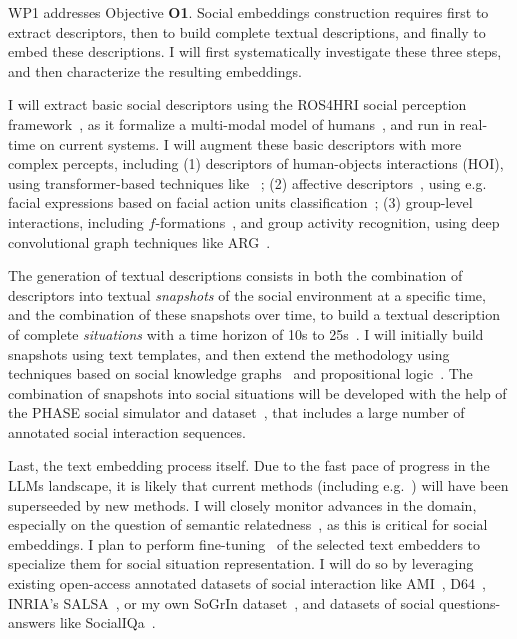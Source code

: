 WP1 addresses Objective \textbf{O1}. Social embeddings construction requires
first to extract descriptors, then to build complete textual descriptions, and
finally to embed these descriptions. I will first systematically investigate
these three steps, and then characterize the resulting embeddings.

I will extract basic social descriptors using the ROS4HRI social perception
framework~\cite{mohamed2021ros4hri}, as it formalize a multi-modal model of
humans~\cite{lemaignan2022ros}, and run in real-time on current systems. I will
augment these basic descriptors with more complex percepts, including (1)
descriptors of human-objects interactions (HOI), using transformer-based
techniques like~\cite{iftekhar2022what} ; (2) affective
descriptors~\cite{vinciarelli2009social}, using e.g. facial expressions based on
facial action units classification~\cite{martinez2019automatic}; (3) group-level
interactions, including $f$-formations~\cite{setti2015fformation}, and group
activity recognition, using deep convolutional graph techniques like
ARG~\cite{wu2019learning}.


The generation of textual descriptions consists in both the combination of
descriptors into textual \emph{snapshots} of the social environment at a
specific time, and the combination of these snapshots over time, to build a
textual description of complete \emph{situations} with a time horizon of 10s to
25s~\cite{netanyahu2021phase}. I will initially build snapshots using text
templates, and then extend the methodology using techniques based on
social knowledge graphs~\cite{sap2019atomic} and propositional
logic~\cite{tsoi2022sean}. The combination of snapshots into social situations
will be developed with the help of the PHASE social simulator and
dataset~\cite{netanyahu2021phase}, that includes a large number of annotated
social interaction sequences.

Last, the text embedding process itself. Due to the fast pace of progress in the
LLMs landscape, it is likely that current
methods (including e.g.~\cite{reimers2019sentencebert,muennighoff2022sgpt}) will
have been superseeded by new methods. I will closely monitor
advances in the domain, especially on the question of semantic
relatedness~\cite{thakur2021beir}, as this is critical for social
embeddings. I plan to perform fine-tuning~\cite{hadsell2006dimensionality}
of the selected text embedders to specialize them for social situation
representation. I will do so by leveraging existing open-access annotated
datasets of social interaction like AMI~\cite{carletta2007ami},
D64~\cite{oertel2013d64}, INRIA's SALSA~\cite{alameda2015salsa}, or my own SoGrIn
dataset~\cite{webb2023sogrin}, and datasets of social questions-answers like
SocialIQa~\cite{sap2019social}.

